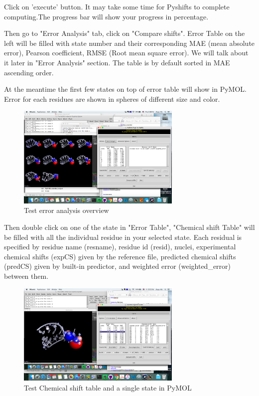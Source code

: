 \documentclass{article}
\begin{document}
Click on 'execute' button. It may take some time for Pyshifts to complete computing.The progress bar will show your progress in percentage.

Then go to "Error Analysis" tab, click on "Compare shifts". Error Table on the left will be filled with state number and their corresponding MAE (mean absolute error), Pearson coefficient, RMSE (Root mean square error). We will talk about it later in "Error Analysis" section. The table is by default sorted in MAE ascending order.

At the meantime the first few states on top of error table will show in PyMOL. Error for each residues are shown in spheres of different size and color. 

 
\begin{figure}[htbp]
\centering
\includegraphics[width=0.7\textwidth]{test3}
\caption{Test error analysis overview}
\label{fig:test3}
\end{figure}
 
Then double click on one of the state in "Error Table", "Chemical shift Table" will be filled with all the individual residue in your selected state. Each residual is specified by residue name (resname), residue id (resid), nuclei, experimental chemical shifts (expCS) given by the reference file, predicted chemical shifts (predCS) given by built-in predictor, and weighted error (weighted\_error) between them.

\begin{figure}[htbp]
\centering
\includegraphics[width=0.7\textwidth]{test4}
\caption{Test Chemical shift table and a single state in PyMOL}
\label{fig:test4}
\end{figure}
\end{document}

